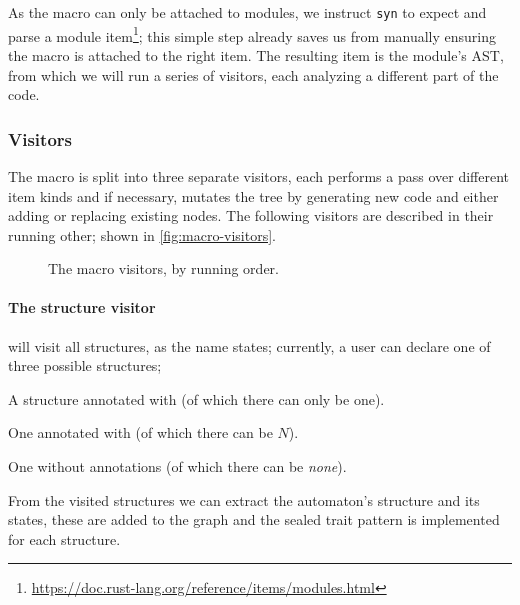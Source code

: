 As the  macro can only be attached to modules,
we instruct \texttt{syn} to expect and parse a module item\footnote{\url{https://doc.rust-lang.org/reference/items/modules.html}};
this simple step already saves us from manually ensuring the macro is attached to the right item.
The resulting item is the module's \gls{AST}, from which we will run a series of visitors,
each analyzing a different part of the code. %

\subsubsection{Visitors}\label{sec:macro-dsl:architecture:visitors}

The macro is split into three separate visitors, each performs a pass over different item kinds and if necessary,
mutates the tree by generating new code and either adding or replacing existing nodes.
The following visitors are described in their running other; shown in \autoref{fig:macro-visitors}.

\begin{figure}
    \centering
    \caption{The  macro visitors, by running order.}
    \label{fig:macro-visitors}
\end{figure}

\paragraph{The structure visitor} will visit all structures, as the name states;
currently, a user can declare one of three possible structures;
\begin{compactitem}
    \item A structure annotated with  (of which there can only be one).
    \item One annotated with  (of which there can be $N$).
    \item One without annotations (of which there can be \emph{none}).
\end{compactitem}
From the visited structures we can extract the automaton's structure and its states,
these are added to the graph and the sealed trait pattern is implemented for each structure.

